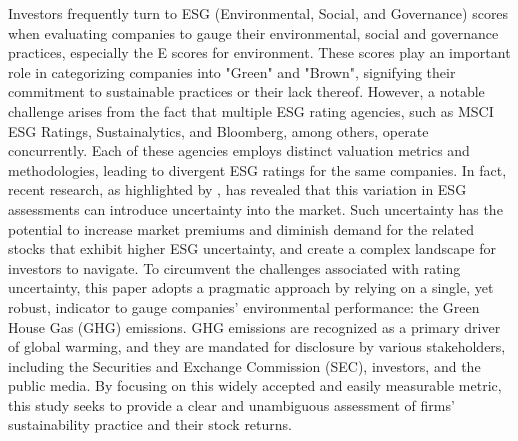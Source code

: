 \documentclass[12pt]{article}
\begin{document}
Investors frequently turn to ESG (Environmental, Social, and Governance) scores when evaluating companies to gauge their environmental, social and governance practices, especially the E scores for environment. These scores play an important role in categorizing companies into "Green" and "Brown", signifying their commitment to sustainable practices or their lack thereof. However, a notable challenge arises from the fact that multiple ESG rating agencies, such as MSCI ESG Ratings, Sustainalytics, and Bloomberg, among others, operate concurrently. Each of these agencies employs distinct valuation metrics and methodologies, leading to divergent ESG ratings for the same companies. In fact, recent research, as highlighted by \cite{avramov2022sustainable}, has revealed that this variation in ESG assessments can introduce uncertainty into the market. Such uncertainty has the potential to increase market premiums and diminish demand for the related stocks that exhibit higher ESG uncertainty, and create a complex landscape for investors to navigate. To circumvent the challenges associated with rating uncertainty, this paper adopts a pragmatic approach by relying on a single, yet robust, indicator to gauge companies' environmental performance: the Green House Gas (GHG) emissions. GHG emissions are recognized as a primary driver of global warming, and they are mandated for disclosure by various stakeholders, including the Securities and Exchange Commission (SEC), investors, and the public media. By focusing on this widely accepted and easily measurable metric, this study seeks to provide a clear and unambiguous assessment of firms' sustainability practice and their stock returns. 
\end{document}
